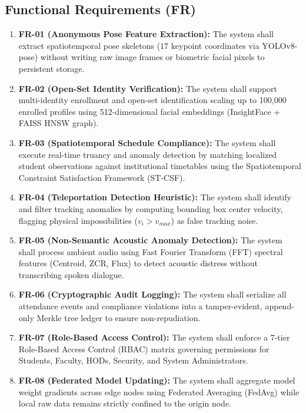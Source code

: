 \documentclass[12pt,a4paper,oneside]{report}
\begin{document}
\subsection{Functional Requirements (FR)}
\begin{enumerate}
    \item \textbf{FR-01 (Anonymous Pose Feature Extraction):} The system shall extract spatiotemporal pose skeletons ($17$ keypoint coordinates via YOLOv8-pose) without writing raw image frames or biometric facial pixels to persistent storage.
    \item \textbf{FR-02 (Open-Set Identity Verification):} The system shall support multi-identity enrollment and open-set identification scaling up to 100,000 enrolled profiles using 512-dimensional facial embeddings (InsightFace + FAISS HNSW graph).
    \item \textbf{FR-03 (Spatiotemporal Schedule Compliance):} The system shall execute real-time truancy and anomaly detection by matching localized student observations against institutional timetables using the Spatiotemporal Constraint Satisfaction Framework (ST-CSF).
    \item \textbf{FR-04 (Teleportation Detection Heuristic):} The system shall identify and filter tracking anomalies by computing bounding box center velocity, flagging physical impossibilities ($v_i > v_{max}$) as false tracking noise.
    \item \textbf{FR-05 (Non-Semantic Acoustic Anomaly Detection):} The system shall process ambient audio using Fast Fourier Transform (FFT) spectral features (Centroid, ZCR, Flux) to detect acoustic distress without transcribing spoken dialogue.
    \item \textbf{FR-06 (Cryptographic Audit Logging):} The system shall serialize all attendance events and compliance violations into a tamper-evident, append-only Merkle tree ledger to ensure non-repudiation.
    \item \textbf{FR-07 (Role-Based Access Control):} The system shall enforce a 7-tier Role-Based Access Control (RBAC) matrix governing permissions for Students, Faculty, HODs, Security, and System Administrators.
    \item \textbf{FR-08 (Federated Model Updating):} The system shall aggregate model weight gradients across edge nodes using Federated Averaging (FedAvg) while local raw data remains strictly confined to the origin node.
\end{enumerate}
\end{document}

